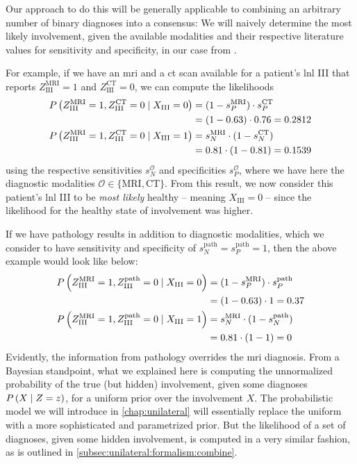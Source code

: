 \documentclass[\relativeRoot/main.tex]{subfiles}
\begin{document}
Our approach to do this will be generally applicable to combining an arbitrary number of binary diagnoses into a consensus: We will naively determine the most likely involvement, given the available modalities and their respective literature values for sensitivity and specificity, in our case from .

For example, if we have an \gls{mri} and a \gls{ct} scan available for a patient's \gls{lnl} III that reports $Z_\text{III}^\text{MRI} = 1$ and $Z_\text{III}^\text{CT} = 0$, we can compute the likelihoods
%
\begin{equation}
    \begin{aligned}
        P \left( Z_\text{III}^\text{MRI} = 1, Z_\text{III}^\text{CT} = 0 \mid X_\text{III} = 0 \right)
        &= (1 - s^\text{MRI}_P) \cdot s^\text{CT}_P \\
        &= (1 - 0.63) \cdot 0.76 = 0.2812 \\
        P \left( Z_\text{III}^\text{MRI} = 1, Z_\text{III}^\text{CT} = 0 \mid X_\text{III} = 1 \right)
        &= s^\text{MRI}_N \cdot (1 - s^\text{CT}_N) \\
        &= 0.81 \cdot (1 - 0.81) = 0.1539
    \end{aligned}
\end{equation}
%
using the respective sensitivities $s_N^\mathcal{O}$ and specificities $s_P^\mathcal{O}$, where we have here the diagnostic modalities $\mathcal{O} \in \{ \text{MRI}, \text{CT} \}$. From this result, we now consider this patient's \gls{lnl} III to be \emph{most likely} healthy -- meaning $X_\text{III} = 0$ -- since the likelihood for the healthy state of involvement was higher.

If we have pathology results in addition to diagnostic modalities, which we consider to have sensitivity and specificity of $s^\text{path}_N = s^\text{path}_P = 1$, then the above example would look like below:
%
\begin{equation}
    \begin{aligned}
        P \left( Z_\text{III}^\text{MRI} = 1, Z_\text{III}^\text{path} = 0 \mid X_\text{III} = 0 \right)
        &= (1 - s^\text{MRI}_P) \cdot s^\text{path}_P \\
        &= (1 - 0.63) \cdot 1 = 0.37 \\
        P \left( Z_\text{III}^\text{MRI} = 1, Z_\text{III}^\text{path} = 0 \mid X_\text{III} = 1 \right)
        &= s^\text{MRI}_N \cdot (1 - s^\text{path}_N) \\
        &= 0.81 \cdot (1 - 1) = 0
    \end{aligned}
\end{equation}
%
Evidently, the information from pathology overrides the \gls{mri} diagnosis. From a Bayesian standpoint, what we explained here is computing the unnormalized probability of the true (but hidden) involvement, given some diagnoses $P \left( X \mid Z=z \right)$, for a uniform prior over the involvement $X$. The probabilistic model we will introduce in \cref{chap:unilateral} will essentially replace the uniform with a more sophisticated and parametrized prior. But the likelihood of a set of diagnoses, given some hidden involvement, is computed in a very similar fashion, as is outlined in \cref{subsec:unilateral:formalism:combine}. 
\end{document}
